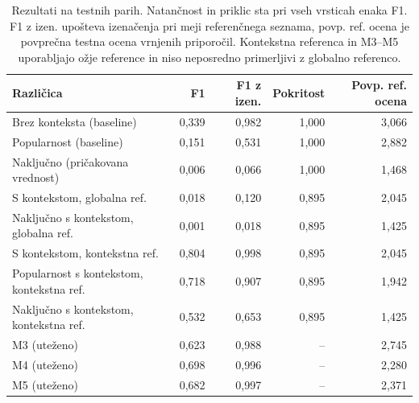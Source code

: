 \begin{table}[htbp]
\centering
\caption{Rezultati na testnih parih. Natančnost in priklic sta pri vseh vrsticah enaka F1. F1 z izen. upošteva izenačenja pri meji referenčnega seznama, povp. ref. ocena je povprečna testna ocena vrnjenih priporočil. Kontekstna referenca in M3--M5 uporabljajo ožje reference in niso neposredno primerljivi z globalno referenco.}
\label{tab:results_all_layers}
\footnotesize
\setlength{\tabcolsep}{4pt}
\begin{tabular}{lrrrr}
\toprule
Različica & F1 & F1 z izen. & Pokritost & Povp. ref. ocena \\
\midrule
Brez konteksta (baseline) & 0,339 & 0,982 & 1,000 & 3,066 \\
Popularnost (baseline) & 0,151 & 0,531 & 1,000 & 2,882 \\
Naključno (pričakovana vrednost) & 0,006 & 0,066 & 1,000 & 1,468 \\
S kontekstom, globalna ref. & 0,018 & 0,120 & 0,895 & 2,045 \\
Naključno s kontekstom, globalna ref. & 0,001 & 0,018 & 0,895 & 1,425 \\
S kontekstom, kontekstna ref. & 0,804 & 0,998 & 0,895 & 2,045 \\
Popularnost s kontekstom, kontekstna ref. & 0,718 & 0,907 & 0,895 & 1,942 \\
Naključno s kontekstom, kontekstna ref. & 0,532 & 0,653 & 0,895 & 1,425 \\
M3 (uteženo) & 0,623 & 0,988 & -- & 2,745 \\
M4 (uteženo) & 0,698 & 0,996 & -- & 2,280 \\
M5 (uteženo) & 0,682 & 0,997 & -- & 2,371 \\
\bottomrule
\end{tabular}

\end{table}
